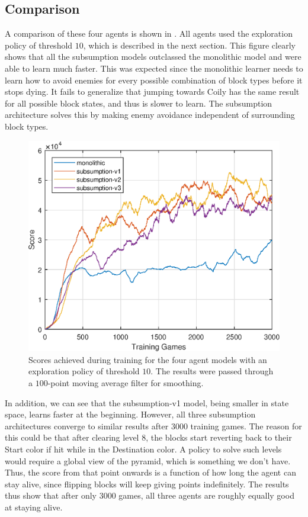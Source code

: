 \documentclass[journal,hidelinks]{IEEEtran}
\begin{document}
\subsection{Comparison}

A comparison of these four agents is shown in . All agents used the exploration policy of threshold $10$, which is described in the next section. This figure clearly shows that all the subsumption models outclassed the monolithic model and were able to learn much faster. This was expected since the monolithic learner needs to learn how to avoid enemies for every possible combination of block types before it stops dying. It fails to generalize that jumping towards Coily has the same result for all possible block states, and thus is slower to learn. The subsumption architecture solves this by making enemy avoidance independent of surrounding block types.

\begin{figure}[!htb]
  \centering
  \includegraphics[width=0.8\columnwidth]{figures/generalization.eps}
  \caption{Scores achieved during training for the four agent models with an exploration policy of threshold $10$. The results were passed through a $100$-point moving average filter for smoothing.}
  \label{fig:generalization}
\end{figure}

In addition, we can see that the subsumption-v1 model, being smaller in state space, learns faster at the beginning. However, all three subsumption architectures converge to similar results after $3000$ training games. The reason for this could be that after clearing level 8, the blocks start reverting back to their Start color if hit while in the Destination color. A policy to solve such levels would require a global view of the pyramid, which is something we don't have. Thus, the score from that point onwards is a function of how long the agent can stay alive, since flipping blocks will keep giving points indefinitely. The results thus show that after only $3000$ games, all three agents are roughly equally good at staying alive.
\end{document}
